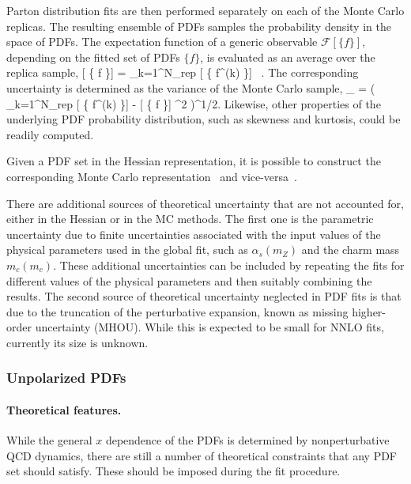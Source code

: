 Parton distribution fits are then performed separately on each of the 
Monte Carlo replicas.
%
The resulting ensemble of PDFs samples the probability density in the space
of PDFs.
%
The expectation function of a generic observable $ \mathcal{F} [ \{  f \}]$,
depending on the fitted set of PDFs $\{f\}$,
is evaluated as an average over the replica sample,
\be
\label{masterave}
\la {} [ \{  f \}] \ra
=  \sum_{k=1}^{N_{\rm rep}}
 [ \{  f^{(k)} \}] \, .
\ee
The corresponding uncertainty is determined as the variance of the
Monte Carlo sample,
\be
\sigma_{} =
\left( 
\sum_{k=1}^{N_{\rm rep}}   
\lp {} [ \{  f^{(k)} \}] 
-   \la {} [ \{  f \}] \ra\rp^2 
 \right)^{1/2}.
\label{mastersig}
\ee
Likewise, other properties of the underlying PDF probability distribution, 
such as skewness and kurtosis, could be readily computed.

Given a PDF set in the Hessian representation, it is possible to construct
the corresponding Monte Carlo representation~\cite{Watt:2012tq,Hou:2016sho}
and vice-versa~\cite{Gao:2013bia,Carrazza:2015aoa}.

There are additional sources of theoretical uncertainty that are not accounted 
for, either in the Hessian or in the MC methods.
%
The first one is the parametric uncertainty due to finite uncertainties 
associated with the input values of the physical parameters used in the global 
fit, such as $\alpha_s(m_Z)$ and the charm mass $m_c(m_c)$.
%
These additional uncertainties can be included by repeating the fits for 
different values of the physical parameters and then suitably combining 
the results.
%
The second source of theoretical uncertainty neglected in PDF fits
is that due to the truncation of the perturbative expansion, known
as missing higher-order uncertainty (MHOU).
%
While this is expected to be small for NNLO fits, currently its size is unknown.


\subsubsection{Unpolarized PDFs}
\label{sec:unpPDFs}

\paragraph*{Theoretical features.}
While the general $x$ dependence of the PDFs is determined by
nonperturbative QCD dynamics, there are still a number
of theoretical constraints that any PDF set should satisfy. 
%
These should be imposed during the fit procedure.

